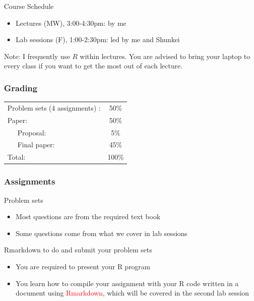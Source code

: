 \documentclass[fleqn]{beamer}\usepackage[]{graphicx}\usepackage[]{color}
\begin{document}

\begin{frame}[c,fragile]
\begin{block}{Course Schedule}
  \begin{itemize}
    \item Lectures (MW), 3:00-4:30pm: by me
    \item Lab sessions (F), 1:00-2:30pm: led by me and Shunkei
  \end{itemize}
\end{block}

  \begin{block}{Note:}
    I frequently use $R$ within lectures. You are advised to bring your laptop to every class if you want to get the most out of each lecture.
  \end{block}
\end{frame}


\begin{frame}[c,fragile]
  \frametitle{Grading}
\begin{center}
\begin{tabular}{lc}
   Problem sets (4 assignments) :& 50\% \\
   Paper: & 50\%\\
     $\;\;\;\;$ Proposal: & 5\%\\
     $\;\;\;\;$ Final paper: & 45\%\\\hline
   Total: & 100\%
\end{tabular}
\end{center}
\end{frame}

\begin{frame}[c]
  \frametitle{Assignments}
  \begin{block}{Problem sets}
    \begin{itemize}
    \item Most questions are from the required text book
    \item Some questions come from what we cover in lab sessions
    \end{itemize}
  \end{block}
  \begin{block}{Rmarkdown to do and submit your problem sets}
  \begin{itemize}
    \item You are required to present your R program
    \item You learn how to compile your assignment with your R code written in a document using \textcolor{red}{Rmarkdown}, which will be covered in the second lab session
  \end{itemize}
  \end{block}
\end{frame}
\end{document}
